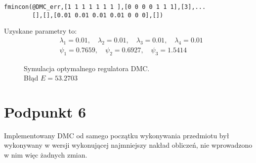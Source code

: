 \begin{lstlisting}[style=Matlab-editor]
fmincon(@DMC_err,[1 1 1 1 1 1 1 ],[0 0 0 0 1 1 1],[3],...
        [],[],[0.01 0.01 0.01 0.01 0 0 0],[])
\end{lstlisting}

Uzyskane parametry to:
\begin{align}
	&\lambda_1 = \num{0,01},\quad\lambda_2 = \num{0,01},\quad\lambda_3 = \num{0,01},\quad\lambda_4 = \num{0,01}\\
	&\psi_1 = \num{0,7659},\quad\psi_2 = \num{0,6927},\quad\psi_3 = \num{1,5414}
\end{align}

\begin{figure}[ht]
	\centering
	
	\caption{Symulacja optymalnego regulatora DMC.\\Błąd $ E = \num{53,2703} $}
	\label{Z5}
\end{figure}

\chapter{Podpunkt 6}
Implementowany DMC od samego początku wykonywania przedmiotu był wykonywany w wersji wykonującej najmniejszy nakład obliczeń, nie wprowadzono w nim więc żadnych zmian.